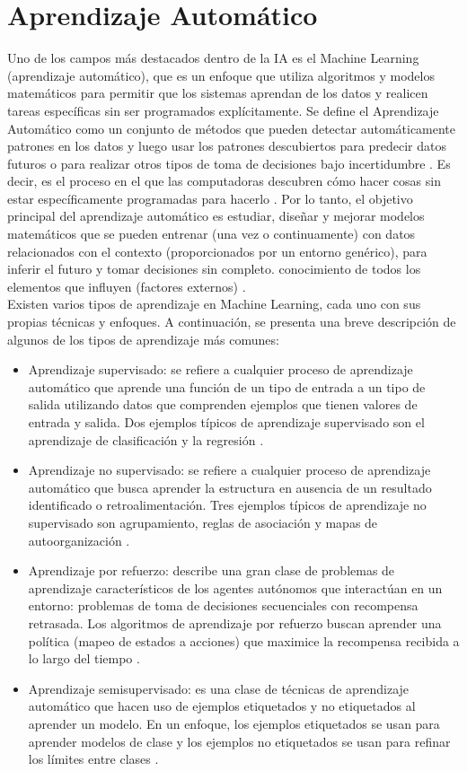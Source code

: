 \section{Aprendizaje Automático}
Uno de los campos más destacados dentro de la IA es el Machine Learning (aprendizaje automático), que es un enfoque que utiliza algoritmos y modelos matemáticos para permitir que los sistemas aprendan de los datos y realicen tareas específicas sin ser programados explícitamente.
Se define el Aprendizaje Automático como un conjunto de métodos que pueden detectar automáticamente patrones en los datos y luego usar los patrones descubiertos para predecir datos futuros o para realizar otros tipos de toma de decisiones bajo incertidumbre \citep{murphy2012machine}. Es decir, es el proceso en el que las computadoras descubren cómo hacer cosas sin estar específicamente programadas para hacerlo \citep{Praba2021}.
Por lo tanto, el objetivo principal del aprendizaje automático es estudiar, diseñar y mejorar modelos matemáticos que se pueden entrenar (una vez o continuamente) con datos relacionados con el contexto (proporcionados por un entorno genérico), para inferir el futuro y tomar decisiones sin completo. conocimiento de todos los elementos que influyen (factores externos) \citep{bonaccorso2017machine}. \\
Existen varios tipos de aprendizaje en Machine Learning, cada uno con sus propias técnicas y enfoques. A continuación, se presenta una breve descripción de algunos de los tipos de aprendizaje más comunes:
\begin{itemize}
	\item Aprendizaje supervisado: se refiere a cualquier proceso de aprendizaje automático que aprende una función de un tipo de entrada a un tipo de salida utilizando datos que comprenden ejemplos que tienen valores de entrada y salida. Dos ejemplos típicos de aprendizaje supervisado son el aprendizaje de clasificación y la regresión \citep{sammut2011encyclopedia}. 
	\item Aprendizaje no supervisado: se refiere a cualquier proceso de aprendizaje automático que busca aprender la estructura en ausencia de un resultado identificado o retroalimentación. Tres ejemplos típicos de aprendizaje no supervisado son agrupamiento, reglas de asociación y mapas de autoorganización \citep{sammut2011encyclopedia}. 
	\item Aprendizaje por refuerzo: describe una gran clase de problemas de aprendizaje característicos de los agentes autónomos que interactúan en un entorno: problemas de toma de decisiones secuenciales con recompensa retrasada. Los algoritmos de aprendizaje por refuerzo buscan aprender una política (mapeo de estados a acciones) que maximice la recompensa recibida a lo largo del tiempo \citep{sammut2011encyclopedia}. 
	\item Aprendizaje semisupervisado: es una clase de técnicas de aprendizaje automático que hacen uso de ejemplos etiquetados y no etiquetados al aprender un modelo. En un enfoque, los ejemplos etiquetados se usan para aprender modelos de clase y los ejemplos no etiquetados se usan para refinar los límites entre clases \citep{Han2011}.
\end{itemize}
